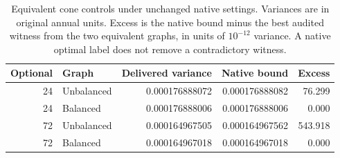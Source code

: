 \begin{table}[htbp]\centering\small
\caption{Equivalent cone controls under unchanged native settings. Variances are in original annual units. Excess is the native bound minus the best audited witness from the two equivalent graphs, in units of $10^{-12}$ variance. A native optimal label does not remove a contradictory witness.}\label{tab:numericcones}
\begin{tabular}{rlrrr}\toprule
Optional & Graph & Delivered variance & Native bound & Excess\\\midrule
24 & Unbalanced & 0.000176888072 & 0.000176888082 & 76.299\\
24 & Balanced & 0.000176888006 & 0.000176888006 & 0.000\\
72 & Unbalanced & 0.000164967505 & 0.000164967562 & 543.918\\
72 & Balanced & 0.000164967018 & 0.000164967018 & 0.000\\
\bottomrule\end{tabular}\end{table}
